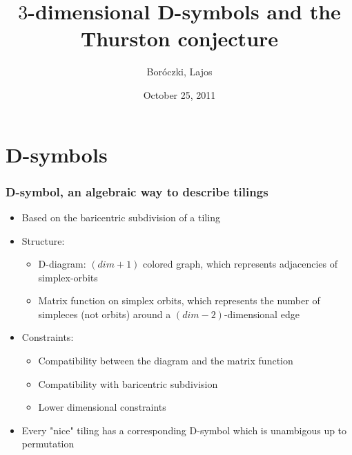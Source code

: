 \usepackage[utf8]{inputenc}
\usepackage{graphicx}
\usepackage{listings}
\usepackage{amsmath}
\usepackage{amssymb}
\usepackage{ae,aecompl}
\usepackage{fix-cm}

\beamertemplatenavigationsymbolsempty
\beamertemplatetextbibitems

\newcommand{\leftexp}[2]{{\vphantom{#2}}^{#1}{#2}}

\title{$3$-dimensional D-symbols and the Thurston conjecture}
\author{Boróczki, Lajos}
\date{October 25, 2011}



\begin{frame}
  \maketitle
\end{frame}

\begin{frame}
  \tableofcontents
\end{frame}
\newpage

\section{D-symbols}
\begin{frame}
  \frametitle{D-symbol, an algebraic way to describe tilings}
  \begin{itemize}
    \item Based on the baricentric subdivision of a tiling
    \item Structure:
      \begin{itemize}
	\item D-diagram: $(dim+1)$ colored graph, which represents adjacencies of
	  simplex-orbits
	\item Matrix function on simplex orbits, which represents the number of
	  simpleces (not orbits) around a $(dim-2)$-dimensional edge
      \end{itemize}
    \item Constraints:
      \begin{itemize}
	\item Compatibility between the diagram and the matrix function
	\item Compatibility with baricentric subdivision
	\item Lower dimensional constraints
      \end{itemize}
    \item Every "nice" tiling has a corresponding D-symbol which is unambigous
      up to permutation 
  \end{itemize}
\end{frame}

